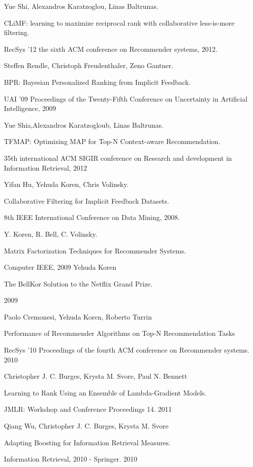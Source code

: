 \documentclass[14pt]{extarticle}
\begin{document}
	\begin{thebibliography}{00} %
    	
    	Yue Shi, Alexandros Karatzoglou, Linas Baltrunas.
    	
CLiMF: learning to maximize reciprocal rank with collaborative less-is-more filtering. 	
    	
    RecSys '12 the sixth ACM conference on Recommender systems, 2012.    	
    	
         
	     Steffen Rendle, Christoph Freudenthaler, Zeno Gantner.    
         
         BPR: Bayesian Personalized Ranking from Implicit Feedback.
         
         UAI '09 Proceedings of the Twenty-Fifth Conference on Uncertainty in Artificial Intelligence, 2009
         
		
		Yue Shia,Alexandros Karatzogloub, Linas Baltrunas.
		
TFMAP: Optimizing MAP for Top-N Context-aware Recommendation.		
		
		35th international ACM SIGIR conference on Research and development in Information Retrieval, 2012
		
	Yifan Hu, Yehuda Koren, Chris Volinsky.
	
	Collaborative Filtering for Implicit Feedback Datasets.
	
	8th IEEE International Conference on Data Mining, 2008.
	
	
	Y. Koren, R. Bell, C. Volinsky.	
	
	Matrix Factorization Techniques for Recommender Systems.
	
	Computer IEEE, 2009
	Yehuda Koren
	
	The BellKor Solution to the Netflix Grand Prize. 
	
	2009

	
    Paolo Cremonesi, Yehuda Koren, Roberto Turrin	
	
	Performance of Recommender Algorithms on Top-N Recommendation Tasks
	
	RecSys '10 Proceedings of the fourth ACM conference on Recommender systems. 2010
	
	
	Christopher J. C. Burges, Krysta M. Svore, Paul N. Bennett
		
	Learning to Rank Using an Ensemble of Lambda-Gradient Models.
	
	JMLR: Workshop and Conference Proceedings 14. 2011
		
	
	Qiang Wu, Christopher J. C. Burges, Krysta M. Svore	
	
	Adapting Boosting for Information Retrieval Measures.
	
	Information Retrieval, 2010 - Springer. 2010
	
\end{thebibliography}
\end{document}
